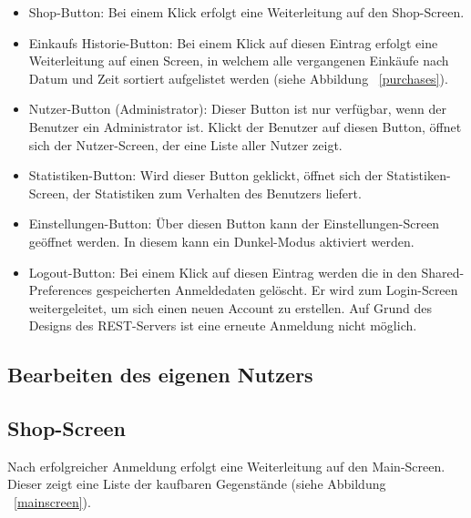 \begin{itemize}
	\item Shop-Button: Bei einem Klick erfolgt eine Weiterleitung auf den Shop-Screen.

	\item Einkaufs Historie-Button: Bei einem Klick auf diesen Eintrag erfolgt eine Weiterleitung auf einen Screen, in welchem alle vergangenen Einkäufe nach Datum und Zeit sortiert aufgelistet werden (siehe Abbildung ~\ref{purchases}).

	\item Nutzer-Button (Administrator): Dieser Button ist nur verfügbar, wenn der Benutzer ein Administrator ist.
	Klickt der Benutzer auf diesen Button, öffnet sich der Nutzer-Screen, der eine Liste aller Nutzer zeigt.

	\item Statistiken-Button: Wird dieser Button geklickt, öffnet sich der Statistiken-Screen, der Statistiken zum Verhalten des Benutzers liefert.

	\item Einstellungen-Button: Über diesen Button kann der Einstellungen-Screen geöffnet werden.
	In diesem kann ein Dunkel-Modus aktiviert werden.

	\item Logout-Button: Bei einem Klick auf diesen Eintrag werden die in den Shared-Preferences gespeicherten Anmeldedaten gelöscht.
	Er wird zum Login-Screen weitergeleitet, um sich einen neuen Account zu erstellen.
	Auf Grund des Designs des REST-Servers ist eine erneute Anmeldung nicht möglich.
\end{itemize}

\subsection{Bearbeiten des eigenen Nutzers} \label{subsec:edit-user}

\subsection{Shop-Screen}\label{subsec:shop-screen}

Nach erfolgreicher Anmeldung erfolgt eine Weiterleitung auf den Main-Screen.
Dieser zeigt eine Liste der kaufbaren Gegenstände (siehe Abbildung ~\ref{mainscreen}).


